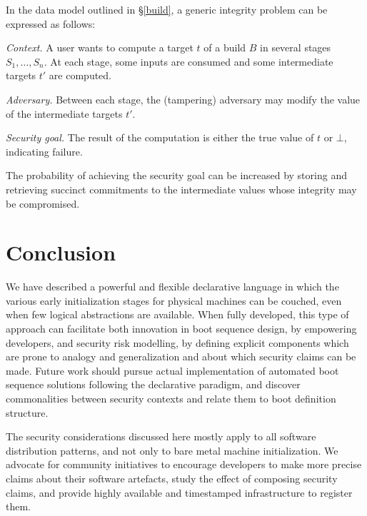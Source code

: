 \begin{example}

  In the data model outlined in \S\ref{build}, a generic integrity problem can be expressed as follows:
  
  \emph{Context.} A user wants to compute a target \(t\) of a build \(B\) in several stages \(S_1,\ldots,S_n\). At each stage, some inputs are consumed and some intermediate targets \(t'\) are computed.
  
  \emph{Adversary.} Between each stage, the (tampering) adversary may modify the value of the intermediate targets \(t'\).
  
  \emph{Security goal.} The result of the computation is either the true value of \(t\) or \(\bot\), indicating failure.

  The probability of achieving the security goal can be increased by storing and retrieving succinct commitments to the intermediate values whose integrity may be compromised.

\end{example}


\section{Conclusion}

We have described a powerful and flexible declarative language in which the various early initialization stages for physical machines can be couched, even when few logical abstractions are available.
%
When fully developed, this type of approach can facilitate both innovation in boot sequence design, by empowering developers, and security risk modelling, by defining explicit components which are prone to analogy and generalization and about which security claims can be made.
%
Future work should pursue actual implementation of automated boot sequence solutions following the declarative paradigm, and discover commonalities between security contexts and relate them to boot definition structure.

The security considerations discussed here mostly apply to all software distribution patterns, and not only to bare metal machine initialization.
%
We advocate for community initiatives to encourage developers to make more precise claims about their software artefacts, study the effect of composing security claims, and provide highly available and timestamped infrastructure to register them.
%

\printbibliography